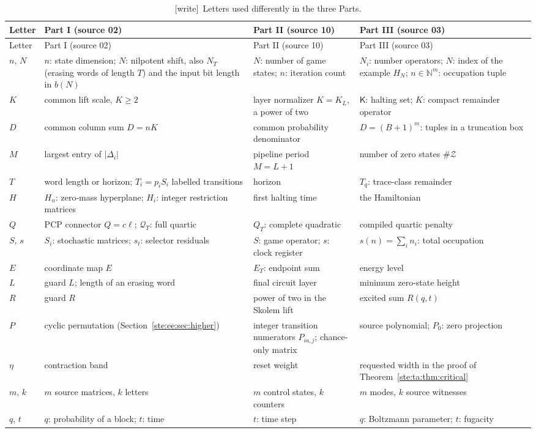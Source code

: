\documentclass[11pt,letterpaper]{article}
\theoremstyle{definition}
\theoremstyle{remark}
\newcommand{\N}{\mathbb N}
\newcommand{\abs}[1]{\left\lvert #1\right\rvert}
\newcommand{\wtag}{\textup{[write]}}
\begin{document}
\begin{longtable}{@{}L{0.07\textwidth}L{0.28\textwidth}L{0.28\textwidth}L{0.28\textwidth}@{}}
\caption{\wtag\ Letters used differently in the three Parts.}\label{ste:tab:notation}\\
\toprule
Letter & Part I (source 02) & Part II (source 10) & Part III (source 03)\\
\midrule
\endfirsthead
\toprule
Letter & Part I (source 02) & Part II (source 10) & Part III (source 03)\\
\midrule
\endhead
\bottomrule
\endfoot
$n$, $N$ & $n$: state dimension; $N$: nilpotent shift, also $N_T$ (erasing words of length $T$) and the input bit length in $b(N)$ & $N$: number of game states; $n$: iteration count & $N_i$: number operators; $N$: index of the example $H_N$; $n\in\N^m$: occupation tuple\\
$K$ & common lift scale, $K\ge2$ & layer normalizer $K=K_L$, a power of two & $\mathsf K$: halting set; $K$: compact remainder operator\\
$D$ & common column sum $D=nK$ & common probability denominator & $D=(B+1)^m$: tuples in a truncation box\\
$M$ & largest entry of $\abs{\Delta_i}$ & pipeline period $M=L+1$ & number of zero states $\#\mathcal Z$\\
$T$ & word length or horizon; $T_i=p_iS_i$ labelled transitions & horizon & $T_q$: trace-class remainder\\
$H$ & $H_n$: zero-mass hyperplane; $H_i$: integer restriction matrices & first halting time & the Hamiltonian\\
$Q$ & PCP connector $Q=c\ell$; $\mathcal Q_T$: full quartic & $Q_T$: complete quadratic & compiled quartic penalty\\
$S$, $s$ & $S_i$: stochastic matrices; $s_t$: selector residuals & $S$: game operator; $s$: clock register & $s(n)=\sum_in_i$: total occupation\\
$E$ & coordinate map $E$ & $E_T$: endpoint sum & energy level\\
$L$ & guard $L$; length of an erasing word & final circuit layer & minimum zero-state height\\
$R$ & guard $R$ & power of two in the Skolem lift & excited sum $R(q,t)$\\
$P$ & cyclic permutation (Section~\ref{ste:ee:sec:higher}) & integer transition numerators $P_{ia,j}$; chance-only matrix & source polynomial; $P_0$: zero projection\\
$\eta$ & contraction band & reset weight & requested width in the proof of Theorem~\ref{ste:ta:thm:critical}\\
$m$, $k$ & $m$ source matrices, $k$ letters & $m$ control states, $k$ counters & $m$ modes, $k$ source witnesses\\
$q$, $t$ & $q$: probability of a block; $t$: time & $t$: time step & $q$: Boltzmann parameter; $t$: fugacity\\
\end{longtable}
\end{document}
